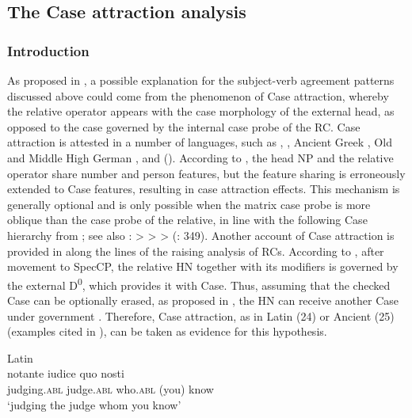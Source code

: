 \documentclass[output=paper]{langsci/langscibook}
\begin{document}
\subsection{The Case attraction analysis}%
\subsubsection{Introduction}

As proposed in \citet{Łęska2016}, a possible explanation for the subject-verb agreement patterns discussed above could come from the phenomenon of Case attraction, whereby the relative operator appears with the case morphology of the external head, as opposed to the case governed by the internal case probe of the RC. Case attraction is attested in a number of languages, such as  \citep{Aghaei2006},  \citep{Bianchi1999}, Ancient Greek \citep{Bianchi1999}, Old and Middle High German \citep{Pittner1995}, and  (\citealt{Bader2006}). According to \citet{Bader2006}, the head NP and the relative operator share number and person features, but the feature sharing is erroneously extended to Case features, resulting in case attraction effects. This mechanism is generally optional and is only possible when the matrix case probe is more oblique than the case probe of the relative, in line with the following Case hierarchy from \citet[200--202]{Pittner1995}; see also \citet[122]{Grosu1994}: \GEN > \DAT > \ACC > \NOM (\citet{Georgi2014}: 349). Another account of Case attraction is provided in \citet{Bianchi1999} along the lines of the raising analysis of RCs. According to \citet{Bianchi1999}, after movement to SpecCP, the relative HN together with its modifiers is governed by the external D\textsuperscript{0}, which provides it with Case. Thus, assuming that the checked Case can be optionally erased, as proposed in \citet[279--282]{Chomsky1995}, the HN can receive another Case under government \citep[95]{Bianchi1999}. Therefore, Case attraction, as in Latin (24) or Ancient  (25) (examples cited in \citealt[94–95]{Bianchi1999}), can be taken as evidence for this hypothesis. 

\settowidth{}
\ea%
         Latin\label{ex:leska:24}\\
    \gll notante   iudice   quo     nosti        \\
         judging.\textsc{abl}   judge.\textsc{abl}   who.\textsc{abl}   (you) know       \\
    \glt ‘judging the judge whom you know’ 
\z
\end{document}

